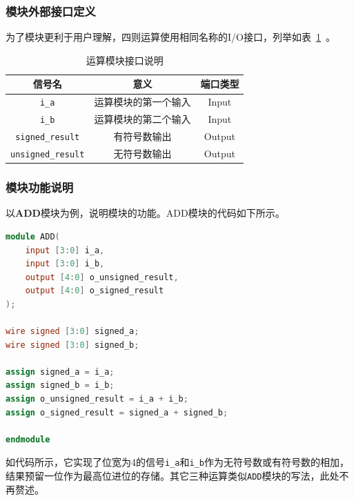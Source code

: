 \documentclass[lang=cn,newtx,10pt,scheme=chinese]{elegantbook}
\begin{document}
\subsubsection{模块外部接口定义}
为了模块更利于用户理解，四则运算使用相同名称的I/O接口，列举如表~\ref{table:interface}~。
\begin{table}[htbp]
    \centering
    \begin{tabular}{ccc}
      \toprule
       信号名 & 意义 & 端口类型\\
      \midrule
        \texttt{i\_a} & 运算模块的第一个输入 & Input \\
       \texttt{i\_b} & 运算模块的第二个输入 & Input \\
       \texttt{signed\_result} & 有符号数输出 & Output \\
       \texttt{unsigned\_result} & 无符号数输出 & Output \\
      \bottomrule
    \end{tabular}
    \caption{运算模块接口说明}
    \label{table:interface}
\end{table}
\subsubsection{模块功能说明}
以\textbf{ADD}模块为例，说明模块的功能。ADD模块的代码如下所示。
\begin{lstlisting}[language=verilog]
  module ADD(
    input [3:0] i_a,
    input [3:0] i_b,
    output [4:0] o_unsigned_result,
    output [4:0] o_signed_result
);

wire signed [3:0] signed_a;
wire signed [3:0] signed_b;

assign signed_a = i_a;
assign signed_b = i_b;
assign o_unsigned_result = i_a + i_b;
assign o_signed_result = signed_a + signed_b;

endmodule
\end{lstlisting}

如代码所示，它实现了位宽为4的信号\texttt{i\_a}和\texttt{i\_b}作为无符号数或有符号数的相加，结果预留一位作为最高位进位的存储。其它三种运算类似\texttt{ADD}模块的写法，此处不再赘述。
\end{document}
